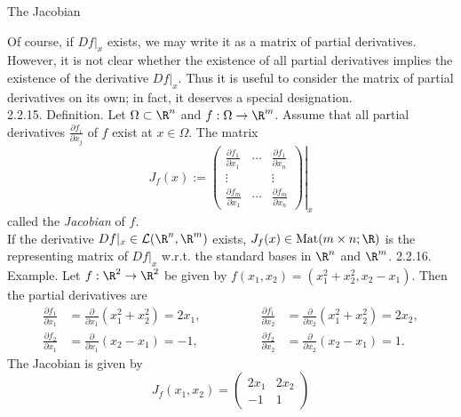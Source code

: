 \documentclass[smaller,hyperref={CJKbookmarks=true}]{beamer}
\begin{document}
\begin{frame}{The Jacobian}
\begin{spacing}{1}
Of course, if $Df|_x$ exists, we may write it as a matrix of partial derivatives.
However, it is not clear whether the existence of all partial derivatives
implies the existence of the derivative $Df|_x$. Thus it is useful to consider
the matrix of partial derivatives on its own; in fact, it deserves a special
designation.\\[6pt]
\alert{2.2.15. Definition.} Let $\Omega\subset\R^n$ and $f:\Omega\to\R^m$. Assume that all partial derivatives $\frac{\partial f_i}{\partial x_j}$ of $f$ exist at $x\in\Omega$. The matrix
\[J_f(x):=\left.\begin{pmatrix}
          \frac{\partial f_1}{\partial x_1} & \cdots & \frac{\partial f_1}{\partial x_n} \\
          \vdots &  & \vdots \\
          \frac{\partial f_m}{\partial x_1} & \cdots & \frac{\partial f_m}{\partial x_n}
        \end{pmatrix}\right|_x\]
called the \emph{Jacobian} of $f$.\\[4pt]
If the derivative $Df|_x\in\mathcal{L}(\R^n,\R^m)$ exists, $J_f(x)\in\text{Mat}(m\times n;\R)$ is the representing matrix of $Df|_x$ w.r.t. the standard bases in $\R^n$ and $\R^m$.
\newpage
\vspace*{11pt}
\alert{2.2.16. Example.} Let $f:\R^2\to\R^2$ be given by $f(x_1,x_2)=(x_1^2+x_2^2,x_2-x_1)$. Then the partial derivatives are
\begin{equation*}
  \begin{aligned}
  \frac{\partial f_1}{\partial x_1}&=\frac{\partial}{\partial x_1}(x_1^2+x_2^2)=2x_1,\\
  \frac{\partial f_2}{\partial x_1}&=\frac{\partial}{\partial x_1}(x_2-x_1)=-1,
  \end{aligned}
  \qquad\qquad
  \begin{aligned}
  \frac{\partial f_1}{\partial x_2}&=\frac{\partial}{\partial x_2}(x_1^2+x_2^2)=2x_2,\\
  \frac{\partial f_2}{\partial x_2}&=\frac{\partial}{\partial x_2}(x_2-x_1)=1.
  \end{aligned}
\end{equation*}
The Jacobian is given by
\[J_f(x_1,x_2)=\begin{pmatrix}
                 2x_1 & 2x_2 \\
                 -1 & 1
               \end{pmatrix}\]

\end{spacing}
\end{frame}
\end{document}
